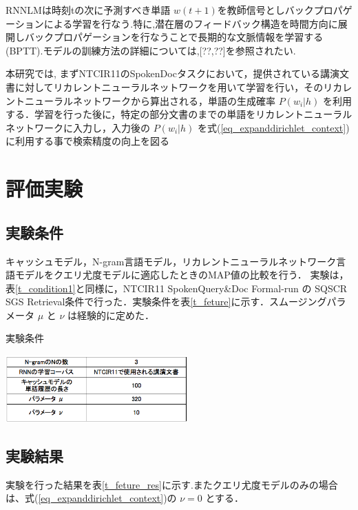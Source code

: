 
RNNLMは時刻tの次に予測すべき単語 $w(t+1)$を教師信号としバックプロパゲーションによる学習を行なう.特に,潜在層のフィードバック構造を時間方向に展開しバックプロパゲーションを行なうことで長期的な文脈情報を学習する(BPTT).モデルの訓練方法の詳細については,[??,??]を参照されたい.

本研究では, まずNTCIR11のSpokenDocタスクにおいて，提供されている講演文書に対してリカレントニューラルネットワークを用いて学習を行い，そのリカレントニューラルネットワークから算出される，単語の生成確率 $P(w_i|h)$ を利用する．学習を行った後に，特定の部分文書のまでの単語をリカレントニューラルネットワークに入力し，入力後の $P(w_i|h)$ を式(\ref{eq_expanddirichlet_context})に利用する事で検索精度の向上を図る

\section{評価実験}
\subsection{実験条件}

キャッシュモデル，N-gram言語モデル，リカレントニューラルネットワーク言語モデルをクエリ尤度モデルに適応したときのMAP値の比較を行う．
実験は，表\ref{t_condition1}と同様に，NTCIR11 SpokenQuery\&Doc Formal-run の SQSCR SGS Retrieval条件で行った．実験条件を表\ref{t_feture}に示す．スムージングパラメータ $\mu$ と $\nu$ は経験的に定めた．

\begin{table}[h]
    \centering
    \caption{実験条件}
    \includegraphics[width=7cm]{./image/t_feature1.png}
    \label{t_feture}
\end{table}

\subsection{実験結果}

実験を行った結果を表\ref{t_feture_res}に示す.またクエリ尤度モデルのみの場合は、式(\ref{eq_expanddirichlet_context})の $\nu = 0$ とする．

